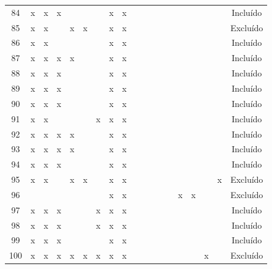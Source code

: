 \documentclass[
	12pt,				%
	oneside,			%
	a4paper,			%
	english,			%
	brazil				%
	]{abntex2ppgsi}
\begin{document}
\begin{apendicesenv}
\begin{table}[H]
\begin{tabular}{c | c c c c c c c c | c c c c c c c c c | c}
84 & x & x & x &   &   &   & x & x &   &   &   &   &   &   &   &   &   & Incluído \\
85 & x & x &   & x & x &   & x & x &   &   &   &   &   &   &   &   &   & Excluído \\
86 & x & x &   &   &   &   & x & x &   &   &   &   &   &   &   &   &   & Incluído \\
87 & x & x & x & x &   &   & x & x &   &   &   &   &   &   &   &   &   & Incluído \\
88 & x & x & x &   &   &   & x & x &   &   &   &   &   &   &   &   &   & Incluído \\
89 & x & x & x &   &   &   & x & x &   &   &   &   &   &   &   &   &   & Incluído \\
90 & x & x & x &   &   &   & x & x &   &   &   &   &   &   &   &   &   & Incluído \\
91 & x & x &   &   &   & x & x & x &   &   &   &   &   &   &   &   &   & Incluído \\
92 & x & x & x & x &   &   & x & x &   &   &   &   &   &   &   &   &   & Incluído \\
93 & x & x & x & x &   &   & x & x &   &   &   &   &   &   &   &   &   & Incluído \\
94 & x & x & x &   &   &   & x & x &   &   &   &   &   &   &   &   &   & Incluído \\
95 & x & x &   & x & x &   & x & x &   &   &   &   &   &   &   &   & x & Excluído \\
96 &   &   &   &   &   &   & x & x &   &   &   &   &   & x & x &   &   & Excluído \\
97 & x & x & x &   &   & x & x & x &   &   &   &   &   &   &   &   &   & Incluído \\
98 & x & x & x &   &   & x & x & x &   &   &   &   &   &   &   &   &   & Incluído \\
99 & x & x & x &   &   &   & x & x &   &   &   &   &   &   &   &   &   & Incluído \\
100 & x & x & x & x & x & x & x & x &   &   &   &   &   &   &   & x &   & Excluído \\
\bottomrule
\end{tabular}
\end{table}



\end{apendicesenv}
\end{document}
